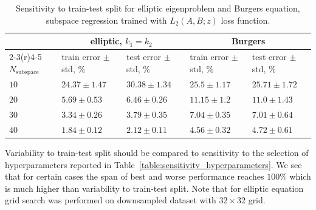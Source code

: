 \documentclass{article}
\begin{document}
\begin{table}[h!]
\caption{Sensitivity to train-test split for elliptic eigenproblem and Burgers equation, subspace regression trained with $L_2(A, B; z)$ loss function.}
\label{table:sensitivity_train_test}
\begin{center}
\hspace*{-0.5cm}  
\begin{tabular}{lllll}
\toprule
& \multicolumn{2}{c}{elliptic, $k_1=k_2$} &  \multicolumn{2}{c}{Burgers}\\
\cmidrule(r){2-3}\cmidrule(r){4-5}
$N_{\text{subspace}}$ & train error $\pm$ std, $\%$ & test error $\pm$ std, $\%$ & train error $\pm$ std, $\%$ & test error $\pm$ std, $\%$\\
\midrule
$10$ & $24.37\pm1.47$ & $30.38\pm1.34$ &  $25.5\pm1.17$ & $25.71\pm1.72$ \\
$20$ & $5.69\pm0.53$ & $6.46\pm0.26$ & $11.15\pm1.2$ & $11.0\pm1.43$\\
$30$ & $3.34\pm0.26$ & $3.79\pm0.35$ & $7.04\pm0.35$ & $7.01\pm0.64$\\
$40$ & $1.84\pm0.12$ & $2.12\pm0.11$ & $4.56\pm0.32$ & $4.72\pm0.61$\\
\bottomrule
\end{tabular}
\end{center}
\end{table}

Variability to train-test split should be compared to sensitivity to the selection of hyperparameters reported in Table~\ref{table:sensitivity_hyperparameters}. We see that for certain cases the span of best and worse performance reaches $100\%$ which is much higher than variability to train-test split. Note that for elliptic equation grid search was performed on downsampled dataset with $32\times32$ grid.
\end{document}
